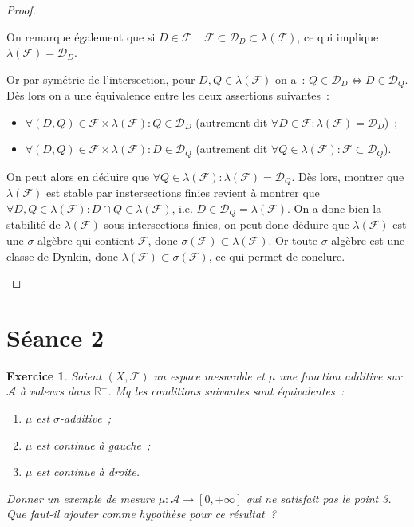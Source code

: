 \documentclass{article}
\newtheorem{ex}{Exercice}[section]
\newcommand{\pinfty}{{+\infty}}
\begin{document}
\begin{proof}
\begin{enumerate}
	On remarque également que si $D \in \mathcal F$~: $\mathcal F \subset \mathcal D_D \subset \lambda(\mathcal F)$, ce qui implique $\lambda(\mathcal F) = \mathcal D_D$.

	Or par symétrie de l'intersection, pour $D, Q \in \lambda(\mathcal F)$ on a~: $Q \in \mathcal D_D \iff D \in \mathcal D_Q$. Dès lors on a une équivalence entre les deux
	assertions suivantes~:
	\begin{itemize}
		\item $\forall (D, Q) \in \mathcal F \times \lambda(\mathcal F) : Q \in \mathcal D_D$ (autrement dit $\forall D \in \mathcal F : \lambda(\mathcal F) = \mathcal D_D$)~;
		\item $\forall (D, Q) \in \mathcal F \times \lambda(\mathcal F) : D \in \mathcal D_Q$ (autrement dit $\forall Q \in \lambda(\mathcal F) : \mathcal F \subset \mathcal D_Q$).
	\end{itemize}

	On peut alors en déduire que $\forall Q \in \lambda(\mathcal F) : \lambda(\mathcal F) = \mathcal D_Q$. Dès lors, montrer que $\lambda(\mathcal F)$ est stable par
	instersections finies revient à montrer que $\forall D, Q \in \lambda(\mathcal F) : D \cap Q \in \lambda(\mathcal F)$, i.e. $D \in \mathcal D_Q = \lambda(\mathcal F)$.
	On a donc bien la stabilité de $\lambda(\mathcal F)$ sous intersections finies, on peut donc déduire que $\lambda(\mathcal F)$ est une $\sigma$-algèbre qui contient $\mathcal F$,
	donc $\sigma(\mathcal F) \subset \lambda(\mathcal F)$. Or toute $\sigma$-algèbre est une classe de Dynkin, donc $\lambda(\mathcal F) \subset \sigma(\mathcal F)$, ce qui permet
	de conclure.
\end{enumerate}
\end{proof}

\newpage
\section{Séance 2}

\begin{ex} Soient $(X, \mathcal F)$ un espace mesurable et $\mu$ une fonction additive sur $\mathcal A$ à valeurs dans $\mathbb R^+$. Mq les conditions suivantes sont équivalentes~:
\begin{enumerate}
	\item $\mu$ est $\sigma$-additive~;
	\item $\mu$ est continue à gauche~;
	\item $\mu$ est continue à droite.
\end{enumerate}

Donner un exemple de mesure $\mu : \mathcal A \to [0, \pinfty]$ qui ne satisfait pas le point 3. Que faut-il ajouter comme hypothèse pour ce résultat~?
\end{ex}
\end{document}
